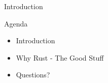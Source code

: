 \begin{section}{Introduction}
  \begin{frame}{Agenda}
    \begin{itemize}
    \item Introduction
    \item Why Rust - The Good Stuff
    \item Questions?
    \end{itemize}
  \end{frame}
\end{section}
